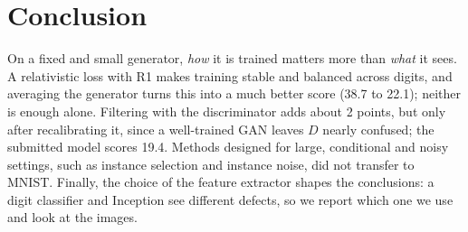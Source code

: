 \section{Conclusion}
On a fixed and small generator, \emph{how} it is trained matters more than \emph{what} it sees. A relativistic loss with R1 makes training stable and balanced across digits, and averaging the generator turns this into a much better score (38.7 to 22.1); neither is enough alone. Filtering with the discriminator adds about 2 points, but only after recalibrating it, since a well-trained GAN leaves $D$ nearly confused; the submitted model scores 19.4. Methods designed for large, conditional and noisy settings, such as instance selection and instance noise, did not transfer to MNIST. Finally, the choice of the feature extractor shapes the conclusions: a digit classifier and Inception see different defects, so we report which one we use and look at the images.
